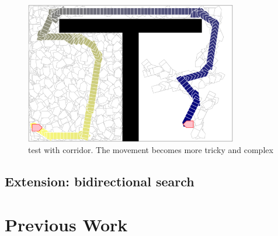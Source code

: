 \documentclass{article}
\begin{document}
\begin{figure}[!h]
\centering
\includegraphics[width=0.827\textwidth]{2-3.png}
\caption{test with corridor. The movement becomes more tricky and complex}
\label{2-3}
\end{figure}






\subsection{Extension: bidirectional search}







\section{Previous Work}
\end{document}
